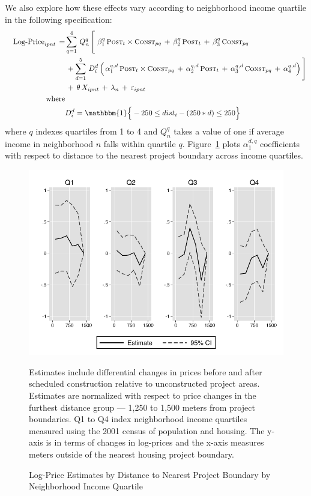 \documentclass[12pt]{article}
\begin{document}
We also explore how these effects vary according to neighborhood income quartile in the following specification:
\begin{align*}
\quad \text{Log-Price}_{ipnt} \, =& \sum_{q=1}^{4} \, Q_{n}^{q} \, \Bigg[ \, \, \beta_1^{q} \, \textsc{\small Post}_{t}\times\textsc{\small Const}_{pq} \, + \, \beta_2^{q} \, \textsc{\small Post}_{t} \, + \, \beta_3^{q} \, \textsc{\small Const}_{pq}\,  \\
 &\, + \sum_{d=1}^{5} \,D_i^{d} \, \Big( \, \alpha_1^{q,d} \, \textsc{\small Post}_{t}\times\textsc{\small Const}_{pq} \, + \, \alpha_2^{q,d} \, \textsc{\small Post}_{t} \, + \, \alpha_3^{q,d} \, \textsc{\small Const}_{pq}\, +\, \alpha_4^{q,d} \Big) \, \Bigg] \\
&\, + \, \theta \, X_{ipnt} \, + \, \lambda_n \, + \, \varepsilon_{ipnt} \quad  \\
\text{where}& \\
& D_i^{d} = \mathbbm{1} \Big\{  - 250 \leq dist_i -(250*d) \leq  250 \Big\}
\end{align*}
\noindent where $q$ indexes quartiles from 1 to 4 and $Q_{n}^{q}$ takes a value of one if average income in neighborhood $n$ falls within quartile $q$.  Figure~\ref{figure:pricesoverdistancehet} plots $\alpha_1^{d,q}$ coefficients with respect to distance to the nearest project boundary across income quartiles.

\begin{figure}[!htb]
       { \centering
   \caption[ Log-Price Estimates by Distance to Nearest Project Boundary by Neighborhood Income Quartile ]
    {\small Log-Price Estimates by Distance to Nearest Project Boundary by Neighborhood Income Quartile}\label{figure:pricesoverdistancehet}
\includegraphics[width=\textwidth,trim={0.3cm .3cm 0.1cm 0cm}, clip=true]{figures/price_dist_3d_ctrl_q_comb.pdf}
} 
Estimates include differential changes in prices before and after scheduled construction relative to unconstructed project areas.  Estimates are normalized with respect to price changes in the furthest distance group --- 1,250 to 1,500 meters from project boundaries.  Q1 to Q4 index neighborhood income quartiles measured using the 2001 census of population and housing.  The y-axis is in terms of changes in log-prices and the x-axis measures meters outside of the nearest housing project boundary.
\end{figure}
\end{document}
